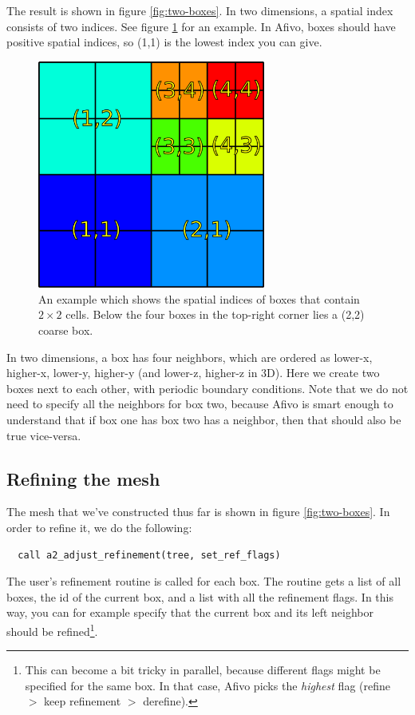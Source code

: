 \documentclass[a4paper, a4wide]{article}
\begin{document}
The result is shown in figure \ref{fig:two-boxes}.
In two dimensions, a spatial index consists of two indices.
See figure \ref{fig:box-indices} for an example.
In Afivo, boxes should have positive spatial indices, so (1,1) is the lowest
index you can give.

\begin{figure}
  \centering
  \includegraphics[width=7.5cm]{figures/box_indices.png}
  \caption{An example which shows the spatial indices of boxes that contain
    $2 \times 2$ cells.
    Below the four boxes in the top-right corner lies a (2,2) coarse box.}
  \label{fig:box-indices}
\end{figure}

In two dimensions, a box has four neighbors, which are ordered as lower-x,
higher-x, lower-y, higher-y (and lower-z, higher-z in 3D).
Here we create two boxes next to each other, with periodic boundary conditions.
Note that we do not need to specify all the neighbors for box two, because Afivo
is smart enough to understand that if box one has box two has a neighbor, then
that should also be true vice-versa.

\subsection{Refining the mesh}
\label{sec:refining-mesh}

The mesh that we've constructed thus far is shown in figure \ref{fig:two-boxes}.
In order to refine it, we do the following:
\begin{lstlisting}
  call a2_adjust_refinement(tree, set_ref_flags)
\end{lstlisting}

The user's refinement routine is called for each box.
The routine gets a list of all boxes, the id of the current box, and a list with
all the refinement flags.
In this way, you can for example specify that the current box and its left neighbor
should be refined\footnote{This can become a bit tricky in parallel, because
  different flags might be specified for the same box.
  In that case, Afivo picks the \emph{highest} flag (refine $>$ keep refinement $>$
  derefine).}.
\end{document}
